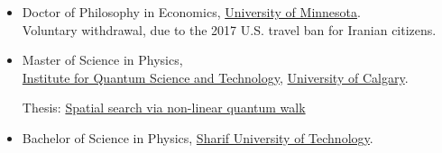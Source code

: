 \documentclass[10pt]{article}
\newenvironment{outerlist}[1][\enskip\textbullet]%
        {\begin{itemize}[#1,leftmargin=*]}{\end{itemize}%
         \vspace{-.6\baselineskip}}
\begin{document}
\begin{outerlist}
\item Doctor of Philosophy in Economics, \href{http://cla.umn.edu/economics}
              {University of Minnesota}.  \\
             Voluntary withdrawal, due to the 2017 U.S. travel ban for Iranian citizens.
%            
%       
%                       
             
\end{outerlist}
\begin{outerlist}
\item Master of Science in Physics, \hspace{2mm} \\ \href{http://www.iqst.ca/}{Institute for Quantum Science and Technology}, \href{http://www.ucalgary.ca/}{University of Calgary}.
           
         Thesis: \href{https://prism.ucalgary.ca/server/api/core/bitstreams/4d5c8717-bab1-4a7d-8caf-32610ab36d2a/content}
             {Spatial search via non-linear quantum walk}\\
       
\end{outerlist}


\begin{outerlist}
\item Bachelor of Science in Physics, 
             \href{http://www.sharif.ir/web/en/}{Sharif University of Technology}.
       
\end{outerlist}
\end{document}
